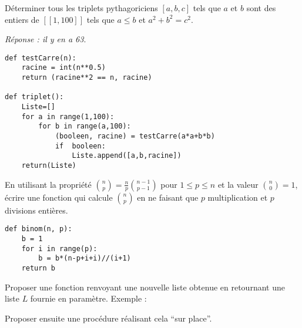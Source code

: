 \begin{Exercise}
Déterminer tous les triplets pythagoriciens $[a,b,c]$ tels que $a$ et $b$ sont des entiers de $[\![1,100]\!]$ tels que  $a\le b$ et $a^2 +b^2 =c^2$.

{\it Réponse : il y en a 63}.
\end{Exercise}
\begin{Answer}
\begin{lstlisting}
def testCarre(n):
    racine = int(n**0.5)
    return (racine**2 == n, racine)
    
def triplet():
    Liste=[]
    for a in range(1,100):
        for b in range(a,100):
            (booleen, racine) = testCarre(a*a+b*b)
            if  booleen:
                Liste.append([a,b,racine])
    return(Liste)
\end{lstlisting}
\end{Answer}
\begin{Exercise}
En utilisant la propriété $\binom n p = \frac np \binom {n-1}{p-1}$ pour $1\le p \le n$ et la valeur $\binom n0=1$, écrire une fonction  qui calcule $\binom n p$ en ne faisant que $p$ multiplication et $p$ divisions entières.
\end{Exercise}
\begin{Answer}
\begin{lstlisting}
def binom(n, p):
    b = 1
    for i in range(p):
        b = b*(n-p+i+i)//(i+1)
    return b
\end{lstlisting}
\end{Answer}
\begin{Exercise}[label = exo:inv]
Proposer une fonction renvoyant une nouvelle liste obtenue en retournant une liste $L$ fournie en paramètre. 
Exemple : 

Proposer ensuite une procédure réalisant cela ``sur place''.

\end{Exercise}
